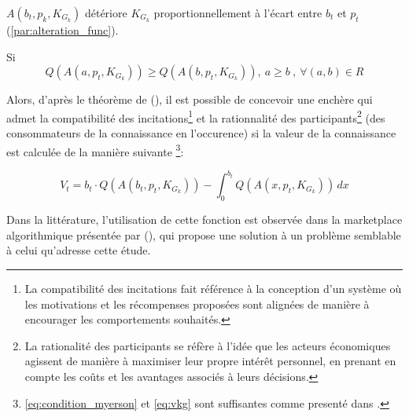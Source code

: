 $A(b_t,p_k,K_{G_k})$ détériore $K_{G_k}$ proportionnellement à l'écart entre $b_t$ et $p_t$ (\ref{par:alteration_func}).

Si \begin{equation} \label{eq:condition_myerson}
    Q(A(a,p_t,K_{G_k})) \geq Q(A(b,p_t,K_{G_k})) , \ a \geq b \  ,\ \forall (a,b) \in R
\end{equation} 

Alors, d'après le théorème de \citeauthor{myerson_optimal_1981} (\citeyear{myerson_optimal_1981}), il est possible de concevoir une enchère qui admet la compatibilité des incitations\footnote{La compatibilité des incitations fait référence à la conception d'un système où les motivations et les récompenses proposées sont alignées de manière à encourager les comportements souhaités.} et la rationnalité des participants\footnote{La rationalité des participants se réfère à l'idée que les acteurs économiques agissent de manière à maximiser leur propre intérêt personnel, en prenant en compte les coûts et les avantages associés à leurs décisions.} (des consommateurs de la connaissance en l'occurence) si la valeur de la connaissance est calculée de la manière suivante \footnote{\ref{eq:condition_myerson} et \ref{eq:vkg} sont suffisantes comme presenté dans \cite{noauthor_myersons_nodate}.}:

\begin{equation} \label{eq:vkg}
    V_t = b_t \cdot Q(A(b_t,p_t,K_{G_k})) -\int_{0}^{b_t} Q(A(x,p_t,K_{G_k})) \, dx
\end{equation}

Dans la littérature, l'utilisation de cette fonction est observée dans la marketplace algorithmique présentée par \citeauthor{agarwal_marketplace_2019} (\citeyear{agarwal_marketplace_2019}), qui propose une solution à un problème semblable à celui qu'adresse cette étude.

